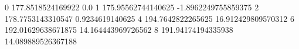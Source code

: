 0 177.8518524169922 0.0
1 175.95562744140625 -1.8962249755859375
2 178.7753143310547 0.9234619140625
4 194.7642822265625 16.912429809570312
6 192.01629638671875 14.164443969726562
8 191.94174194335938 14.089889526367188

